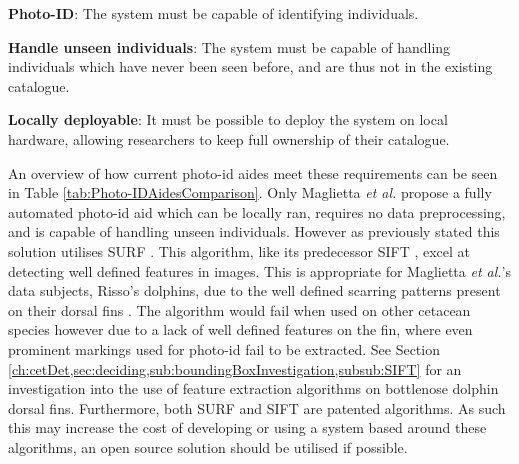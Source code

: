 \textbf{Photo-ID}: The system must be capable of identifying individuals.

\textbf{Handle unseen individuals}: The system must be capable of handling individuals which have never been seen before, and are thus not in the existing catalogue. 

\textbf{Locally deployable}: It must be possible to deploy the system on local hardware, allowing researchers to keep full ownership of their catalogue.

An overview of how current photo-id aides meet these requirements can be seen in Table \ref{tab:Photo-IDAidesComparison}. Only Maglietta \textit{et al.} propose a fully automated photo-id aid which can be locally ran, requires no data preprocessing, and is capable of handling unseen individuals. However as previously stated this solution utilises SURF \cite{bay_speeded-up_2008}. This algorithm, like its predecessor SIFT \cite{lowe_object_1999}, excel at detecting well defined features in images. This is appropriate for Maglietta \textit{et al.}'s data subjects, Risso's dolphins, due to the well defined scarring patterns present on their dorsal fins \cite{mariani_analysis_2016}. The algorithm would fail when used on other cetacean species however due to a lack of well defined features on the fin, where even prominent markings used for photo-id fail to be extracted. See Section \ref{ch:cetDet,sec:deciding,sub:boundingBoxInvestigation,subsub:SIFT} for an investigation into the use of feature extraction algorithms on bottlenose dolphin dorsal fins. Furthermore, both SURF and SIFT are patented algorithms. As such this may increase the cost of developing or using a system based around these algorithms, an open source solution should be utilised if possible.

